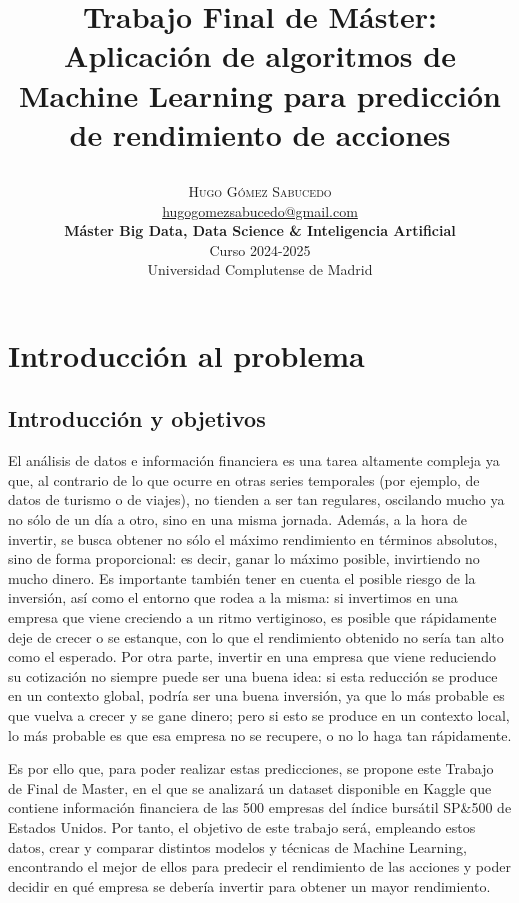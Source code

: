 \documentclass[a4paper,onecolumn]{extarticle}
\title{\begin{center} \Huge Trabajo Final de Máster: \\ Aplicación de algoritmos de Machine Learning para predicción de rendimiento de acciones\end{center}} %
\author{
    \textsc{\huge Hugo Gómez Sabucedo} \\ %
    \large \href{mailto:hugogomezsabucedo@gmail.com}{hugogomezsabucedo@gmail.com} \\ [2ex] %
    \Large \textbf{Máster Big Data, Data Science \& Inteligencia Artificial} \\
    \normalsize Curso 2024-2025 \\
    \large Universidad Complutense de Madrid
}
\date{} %
\let\stdsection\section
\renewcommand\section{\newpage\stdsection}
\begin{document}
\maketitle
\setcounter{tocdepth}{4}
\tableofcontents
\begin{sloppypar}


\section{Introducción al problema} \label{introduccion}
\renewcommand\section{\stdsection}
\subsection{Introducción y objetivos} \label{intro}
El análisis de datos e información financiera es una tarea altamente compleja ya que, al contrario de lo que ocurre en otras series temporales (por ejemplo, 
de datos de turismo o de viajes), no tienden a ser tan regulares, oscilando mucho ya no sólo de un día a otro, sino en una misma jornada. Además, a la hora
de invertir, se busca obtener no sólo el máximo rendimiento en términos absolutos, sino de forma proporcional: es decir, ganar lo máximo posible, invirtiendo 
no mucho dinero. Es importante también tener en cuenta el posible riesgo de la inversión, así como el entorno que rodea a la misma: si invertimos en una empresa
que viene creciendo a un ritmo vertiginoso, es posible que rápidamente deje de crecer o se estanque, con lo que el rendimiento obtenido no sería tan alto como el
esperado. Por otra parte, invertir en una empresa que viene reduciendo su cotización no siempre puede ser una buena idea: si esta reducción se produce en un contexto 
global, podría ser una buena inversión, ya que lo más probable es que vuelva a crecer y se gane dinero; pero si esto se produce en un contexto local, lo más probable 
es que esa empresa no se recupere, o no lo haga tan rápidamente.

Es por ello que, para poder realizar estas predicciones, se propone este Trabajo de Final de Master, en el que se analizará un dataset disponible en Kaggle que contiene 
información financiera de las 500 empresas del índice bursátil SP\&500 de Estados Unidos. Por tanto, el objetivo de este trabajo será, empleando estos datos, crear y
comparar distintos modelos y técnicas de Machine Learning, encontrando el mejor de ellos para predecir el rendimiento de las acciones y poder decidir en qué empresa
se debería invertir para obtener un mayor rendimiento.


\end{sloppypar}
\end{document}
